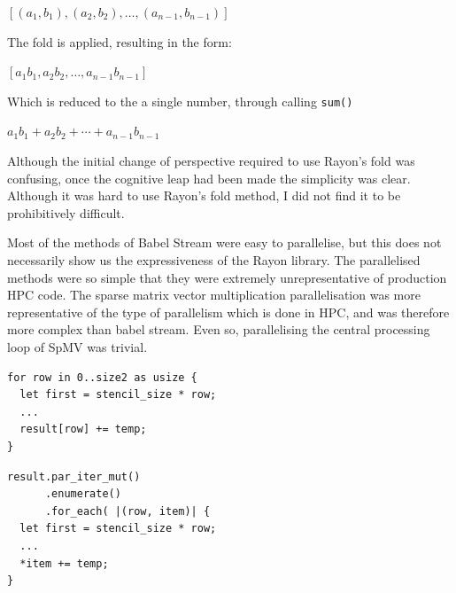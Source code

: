 \begin{center}
$[(a_1, b_1), (a_2, b_2), \ldots, (a_{n-1}, b_{n-1})]$
\end{center}

The fold is applied, resulting in the form:

\begin{center}
$[a_1b_1, a_2b_2, \ldots, a_{n-1}b_{n-1}]$
\end{center}
Which is reduced to the a single number, through calling \texttt{sum()}

\begin{center}
$a_1b_1+a_2b_2+\cdots+a_{n-1}b_{n-1}$
\end{center}

Although the initial change of perspective required to use Rayon's fold was confusing, once the cognitive leap had been made the simplicity was clear. Although it was hard to use Rayon's fold method, I did not find it to be prohibitively difficult.

Most of the methods of Babel Stream were easy to parallelise, but this does not necessarily show us the expressiveness of the Rayon library. The parallelised methods were so simple that they were extremely unrepresentative of production HPC code. The sparse matrix vector multiplication parallelisation was more representative of the type of parallelism which is done in HPC, and was therefore more complex than babel stream. Even so, parallelising the central processing loop of SpMV was trivial.
\noindent\begin{minipage}{.48\textwidth}
\begin{code}
\begin{verbatim}
for row in 0..size2 as usize {
  let first = stencil_size * row;
  ...
  result[row] += temp;
}
\end{verbatim}
\end{code}
\end{minipage}\hfill
\begin{minipage}{.48\textwidth}
\begin{code}
\begin{verbatim}
result.par_iter_mut()
      .enumerate()
      .for_each( |(row, item)| {
  let first = stencil_size * row;
  ...
  *item += temp;
}
\end{verbatim}
\label{lst:spmv-par}
\end{code}
\end{minipage}

